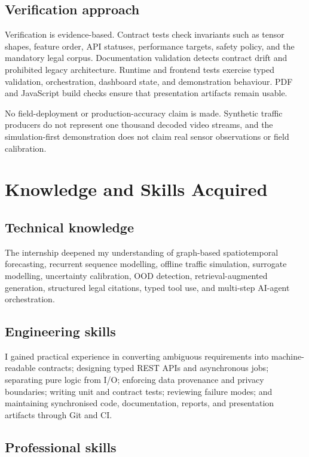 \documentclass[12pt,a4paper]{report}
\begin{document}
\section{Verification approach}

Verification is evidence-based. Contract tests check invariants such as tensor shapes, feature order, API statuses, performance targets, safety policy, and the mandatory legal corpus. Documentation validation detects contract drift and prohibited legacy architecture. Runtime and frontend tests exercise typed validation, orchestration, dashboard state, and demonstration behaviour. PDF and JavaScript build checks ensure that presentation artifacts remain usable.

No field-deployment or production-accuracy claim is made. Synthetic traffic producers do not represent one thousand decoded video streams, and the simulation-first demonstration does not claim real sensor observations or field calibration.

\chapter{Knowledge and Skills Acquired}

\section{Technical knowledge}

The internship deepened my understanding of graph-based spatiotemporal forecasting, recurrent sequence modelling, offline traffic simulation, surrogate modelling, uncertainty calibration, OOD detection, retrieval-augmented generation, structured legal citations, typed tool use, and multi-step AI-agent orchestration.

\section{Engineering skills}

I gained practical experience in converting ambiguous requirements into machine-readable contracts; designing typed REST APIs and asynchronous jobs; separating pure logic from I/O; enforcing data provenance and privacy boundaries; writing unit and contract tests; reviewing failure modes; and maintaining synchronised code, documentation, reports, and presentation artifacts through Git and CI.

\section{Professional skills}
\end{document}
